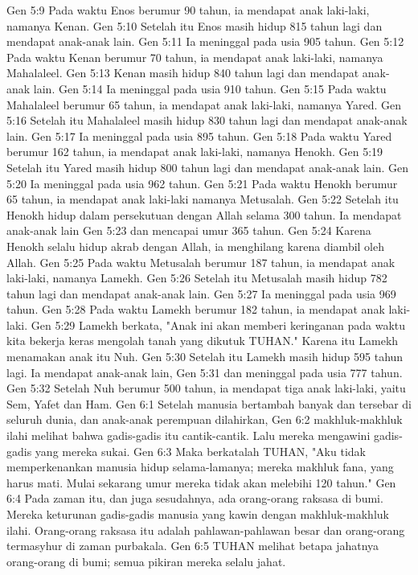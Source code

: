 Gen 5:9  Pada waktu Enos berumur 90 tahun, ia mendapat anak laki-laki, namanya Kenan.
Gen 5:10  Setelah itu Enos masih hidup 815 tahun lagi dan mendapat anak-anak lain.
Gen 5:11  Ia meninggal pada usia 905 tahun.
Gen 5:12  Pada waktu Kenan berumur 70 tahun, ia mendapat anak laki-laki, namanya Mahalaleel.
Gen 5:13  Kenan masih hidup 840 tahun lagi dan mendapat anak-anak lain.
Gen 5:14  Ia meninggal pada usia 910 tahun.
Gen 5:15  Pada waktu Mahalaleel berumur 65 tahun, ia mendapat anak laki-laki, namanya Yared.
Gen 5:16  Setelah itu Mahalaleel masih hidup 830 tahun lagi dan mendapat anak-anak lain.
Gen 5:17  Ia meninggal pada usia 895 tahun.
Gen 5:18  Pada waktu Yared berumur 162 tahun, ia mendapat anak laki-laki, namanya Henokh.
Gen 5:19  Setelah itu Yared masih hidup 800 tahun lagi dan mendapat anak-anak lain.
Gen 5:20  Ia meninggal pada usia 962 tahun.
Gen 5:21  Pada waktu Henokh berumur 65 tahun, ia mendapat anak laki-laki namanya Metusalah.
Gen 5:22  Setelah itu Henokh hidup dalam persekutuan dengan Allah selama 300 tahun. Ia mendapat anak-anak lain
Gen 5:23  dan mencapai umur 365 tahun.
Gen 5:24  Karena Henokh selalu hidup akrab dengan Allah, ia menghilang karena diambil oleh Allah.
Gen 5:25  Pada waktu Metusalah berumur 187 tahun, ia mendapat anak laki-laki, namanya Lamekh.
Gen 5:26  Setelah itu Metusalah masih hidup 782 tahun lagi dan mendapat anak-anak lain.
Gen 5:27  Ia meninggal pada usia 969 tahun.
Gen 5:28  Pada waktu Lamekh berumur 182 tahun, ia mendapat anak laki-laki.
Gen 5:29  Lamekh berkata, "Anak ini akan memberi keringanan pada waktu kita bekerja keras mengolah tanah yang dikutuk TUHAN." Karena itu Lamekh menamakan anak itu Nuh.
Gen 5:30  Setelah itu Lamekh masih hidup 595 tahun lagi. Ia mendapat anak-anak lain,
Gen 5:31  dan meninggal pada usia 777 tahun.
Gen 5:32  Setelah Nuh berumur 500 tahun, ia mendapat tiga anak laki-laki, yaitu Sem, Yafet dan Ham.
Gen 6:1  Setelah manusia bertambah banyak dan tersebar di seluruh dunia, dan anak-anak perempuan dilahirkan,
Gen 6:2  makhluk-makhluk ilahi melihat bahwa gadis-gadis itu cantik-cantik. Lalu mereka mengawini gadis-gadis yang mereka sukai.
Gen 6:3  Maka berkatalah TUHAN, "Aku tidak memperkenankan manusia hidup selama-lamanya; mereka makhluk fana, yang harus mati. Mulai sekarang umur mereka tidak akan melebihi 120 tahun."
Gen 6:4  Pada zaman itu, dan juga sesudahnya, ada orang-orang raksasa di bumi. Mereka keturunan gadis-gadis manusia yang kawin dengan makhluk-makhluk ilahi. Orang-orang raksasa itu adalah pahlawan-pahlawan besar dan orang-orang termasyhur di zaman purbakala.
Gen 6:5  TUHAN melihat betapa jahatnya orang-orang di bumi; semua pikiran mereka selalu jahat.
